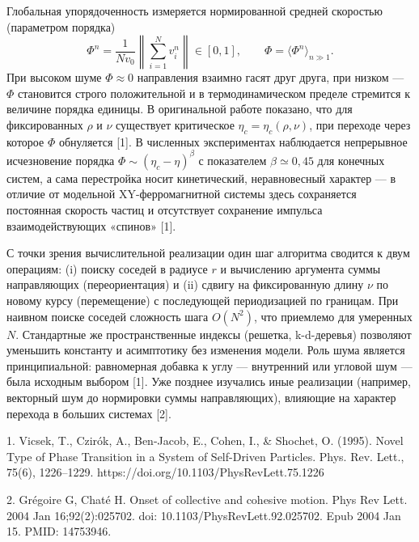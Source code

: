 Глобальная упорядоченность измеряется нормированной средней скоростью (параметром порядка)
\begin{equation}
    \Phi^n=\frac{1}{Nv_0}\left\|\sum_{i=1}^N v_i^n\right\|\in[0,1],\qquad 
    \Phi=\langle \Phi^n\rangle_{n\gg 1}.
\end{equation}
При высоком шуме $\Phi\approx 0$ направления взаимно гасят друг друга, при низком — $\Phi$ становится строго положительной и в термодинамическом пределе стремится к величине порядка единицы. В оригинальной работе показано, что для фиксированных $\rho$ и $\nu$ существует критическое $\eta_c=\eta_c(\rho,\nu)$, при переходе через которое $\Phi$ обнуляется [1]. В численных экспериментах наблюдается непрерывное исчезновение порядка $\Phi\sim(\eta_c-\eta)^\beta$ с показателем $\beta\simeq 0{,}45$ для конечных систем, а сама перестройка носит кинетический, неравновесный характер — в отличие от модельной XY-ферромагнитной системы здесь сохраняется постоянная скорость частиц и отсутствует сохранение импульса взаимодействующих «спинов» [1].

С точки зрения вычислительной реализации один шаг алгоритма сводится к двум операциям: (i) поиску соседей в радиусе $r$ и вычислению аргумента суммы направляющих (переориентация) и (ii) сдвигу на фиксированную длину $\nu$ по новому курсу (перемещение) с последующей периодизацией по границам. При наивном поиске соседей сложность шага $O(N^2)$, что приемлемо для умеренных $N$. Стандартные же пространственные индексы (решетка, k-d-деревья) позволяют уменьшить константу и асимптотику без изменения модели. Роль шума является принципиальной: равномерная добавка к углу — внутренний или угловой шум — была исходным выбором [1]. Уже позднее изучались иные реализации (например, векторный шум до нормировки суммы направляющих), влияющие на характер перехода в больших системах [2].

\noindent\hrulefill

1. Vicsek, T., Czirók, A., Ben-Jacob, E., Cohen, I., & Shochet, O. (1995). Novel Type of Phase Transition in a System of Self-Driven Particles. Phys. Rev. Lett., 75(6), 1226–1229. https://doi.org/10.1103/PhysRevLett.75.1226

2. Grégoire G, Chaté H. Onset of collective and cohesive motion. Phys Rev Lett. 2004 Jan 16;92(2):025702. doi: 10.1103/PhysRevLett.92.025702. Epub 2004 Jan 15. PMID: 14753946.
